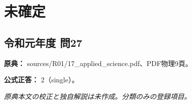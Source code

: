 \section{未確定}

\subsection{令和元年度 問27}
\label{q:r01-reg-applied-27}

\noindent\textbf{原典：} sources/R01/17\_applied\_science.pdf、PDF物理9頁。

\textbf{公式正答：} 2（single）。

\par\textit{原典本文の校正と独自解説は未作成。分類のみの登録項目。}
